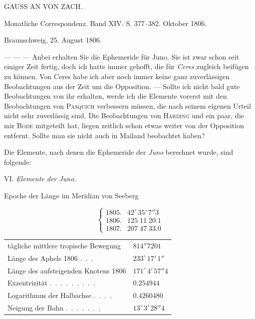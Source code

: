 \begin{center}
GAUSS AN VON ZACH.
\end{center}

\begin{center}
Monatliche Correspondenz. Band XIV. S. 377–382. Oktober 1806.
\end{center}

\begin{flushright}
Braunschweig, 25. August 1806.
\end{flushright}

\par\indent --- --- --- Anbei erhalten Sie die Ephemeride für Juno. Sie ist zwar schon seit einiger Zeit fertig, doch ich hatte immer gehofft, die für \emph{Ceres} zugleich beifügen zu können. Von Ceres habe ich aber noch immer keine ganz zuverlässigen Beobachtungen aus der Zeit um die
%
Opposition. --- Sollte ich nicht bald gute Beobachtungen von ihr erhalten, werde ich die Elemente vorerst mit den Beobachtungen von \textsc{Pasquich} verbessern müssen, die nach seinem eigenen Urteil nicht sehr zuverlässig sind. Die Beobachtungen von \textsc{Harding} und ein paar, die mir \textsc{Bode} mitgeteilt hat, liegen zeitlich schon etwas weiter von der Opposition entfernt. Sollte man sie nicht auch in Mailand beobachtet haben?

\par\indent Die Elemente, nach denen die Ephemeride der \emph{Juno} berechnet wurde, sind folgende:

\begin{center}
VI. \emph{Elemente der Juno.}
\end{center}

\begin{center}
Epoche der Länge im Meridian von Seeberg
\end{center}
\[
\left\{\begin{array}{ll}
1805. & 42^\circ\,35'\,7''3\\
1806. & 125\;11\;20.1\\
1807. & 207\;47\;33.0
\end{array}\right.
\]
\begin{center}\begingroup
\fontsize{9}{11}\selectfont
\setlength{\tabcolsep}{3pt}\renewcommand{\arraystretch}{1.12}
\begin{tabular}{ll}
tägliche mittlere tropische Bewegung  & $814''7201$ \\
Länge des Aphels 1806 .\ .\ . & $233^\circ\,17'\,1''$ \\
Länge des aufsteigenden Knotens 1806  & $171^\circ\,4'\,57''4$ \\
Exzentrizität .\ .\ .\ .\ .\ .\ .\ .\ . & $0.254944$ \\
Logarithmus der Halbachse .\ .\ .\ . & $0.4260480$ \\
Neigung der Bahn .\ .\ .\ .\ .\ .\ . & $13^\circ\,3'\,28''4$ \\
\end{tabular}\endgroup\end{center}

